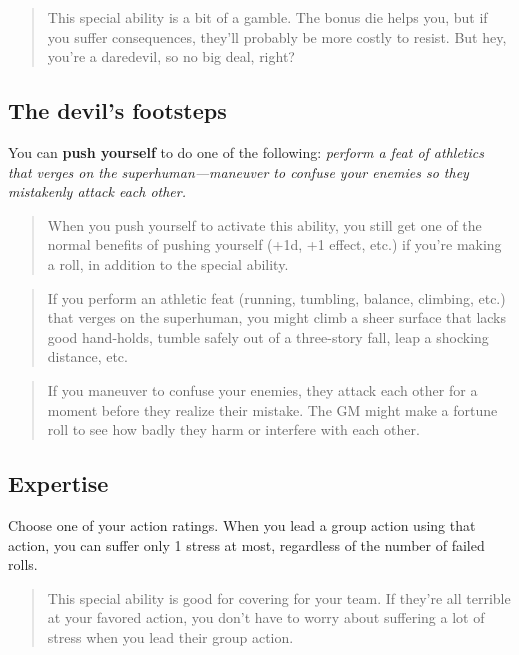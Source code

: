 \documentclass[11pt,oneside]{book}
\begin{document}
\begin{quote}
	This special ability is a bit of a gamble. The bonus die helps you, but if you suffer consequences, they’ll probably be more costly to resist. But hey, you’re a daredevil, so no big deal, right?
\end{quote} 

\subsection{The devil’s footsteps}

You can \textbf{push yourself} to do one of the following: \emph{perform a feat of athletics that verges on the superhuman---maneuver to confuse your enemies so they mistakenly attack each other.}

\begin{quote}
	When you push yourself to activate this ability, you still get one of the normal benefits of pushing yourself (+1d, +1 effect, etc.) if you’re making a roll, in addition to the special ability.
\end{quote} 

\begin{quote}
	If you perform an athletic feat (running, tumbling, balance, climbing, etc.) that verges on the superhuman, you might climb a sheer surface that lacks good hand-holds, tumble safely out of a three-story fall, leap a shocking distance, etc.
\end{quote} 

\begin{quote}
	If you maneuver to confuse your enemies, they attack each other for a moment before they realize their mistake. The GM might make a fortune roll to see how badly they harm or interfere with each other.
\end{quote} 

\subsection{Expertise}

Choose one of your action ratings. When you lead a group action using that action, you can suffer only 1 stress at most, regardless of the number of failed rolls.

\begin{quote}
	This special ability is good for covering for your team. If they’re all terrible at your favored action, you don’t have to worry about suffering a lot of stress when you lead their group action.
\end{quote} 
\end{document}
